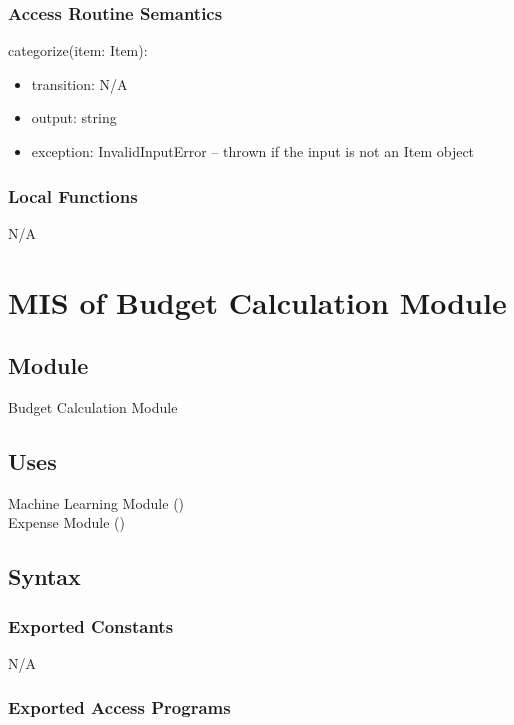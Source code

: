 \documentclass[12pt, titlepage]{article}
\begin{document}
\subsubsection{Access Routine Semantics}

\noindent categorize(item: Item):
\begin{itemize}
\item transition: N/A 
\item output: string 
\item exception: InvalidInputError -- thrown if the input is not an Item object
\end{itemize}

\subsubsection{Local Functions}
N/A

\newpage



\section{MIS of Budget Calculation Module}\label{budget_calculation_module}

\subsection{Module}

Budget Calculation Module

\subsection{Uses}
Machine Learning Module ()\\
Expense Module ()

\subsection{Syntax}

\subsubsection{Exported Constants}
N/A

\subsubsection{Exported Access Programs}
\end{document}
